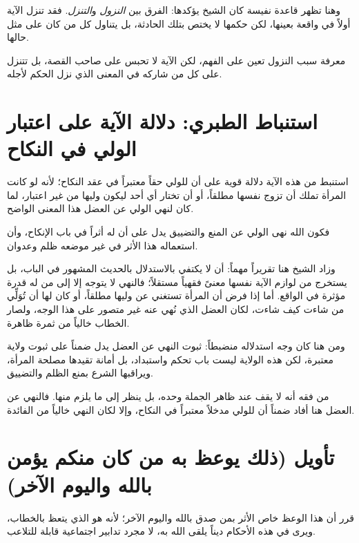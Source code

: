 وهنا تظهر قاعدة نفيسة كان الشيخ يؤكدها: الفرق بين \textit{النزول} و\textit{التنزل}. فقد تنزل الآية أولاً في واقعة بعينها، لكن حكمها لا يختص بتلك الحادثة، بل يتناول كل من كان على مثل حالها.

\begin{fawaid}
معرفة سبب النزول تعين على الفهم، لكن الآية لا تحبس على صاحب القصة، بل تتنزل على كل من شاركه في المعنى الذي نزل الحكم لأجله.
\end{fawaid}

\section{استنباط الطبري: دلالة الآية على اعتبار الولي في النكاح}
استنبط  من هذه الآية دلالة قوية على أن للولي حقاً معتبراً في عقد النكاح؛ لأنه لو كانت المرأة تملك أن تزوج نفسها مطلقاً، أو أن تختار أي أحد ليكون وليها من غير اعتبار، لما كان لنهي الولي عن العضل هذا المعنى الواضح.

فكون الله نهى الولي عن المنع والتضييق يدل على أن له أثراً في باب الإنكاح، وأن استعماله هذا الأثر في غير موضعه ظلم وعدوان.

وزاد الشيخ هنا تقريراً مهماً: أن  لا يكتفي بالاستدلال بالحديث المشهور في الباب، بل يستخرج من لوازم الآية نفسها معنىً فقهياً مستقلاً؛ فالنهي لا يتوجه إلا إلى من له قدرة مؤثرة في الواقع. أما إذا فرض أن المرأة تستغني عن وليها مطلقاً، أو كان لها أن تُوَلِّي من شاءت كيف شاءت، لكان العضل الذي نُهي عنه غير متصور على هذا الوجه، ولصار الخطاب خالياً من ثمرة ظاهرة.

ومن هنا كان وجه استدلاله منضبطاً: ثبوت النهي عن العضل يدل ضمناً على ثبوت ولاية معتبرة، لكن هذه الولاية ليست باب تحكم واستبداد، بل أمانة تقيدها مصلحة المرأة، ويراقبها الشرع بمنع الظلم والتضييق.

\begin{fawaid}
من فقه  أنه لا يقف عند ظاهر الجملة وحده، بل ينظر إلى ما يلزم منها. فالنهي عن العضل هنا أفاد ضمناً أن للولي مدخلاً معتبراً في النكاح، وإلا لكان النهي خالياً من الفائدة.
\end{fawaid}

\section{تأويل (ذلك يوعظ به من كان منكم يؤمن بالله واليوم الآخر)}
قرر  أن هذا الوعظ خاص الأثر بمن صدق بالله واليوم الآخر؛ لأنه هو الذي يتعظ بالخطاب، ويرى في هذه الأحكام ديناً يلقى الله به، لا مجرد تدابير اجتماعية قابلة للتلاعب.

